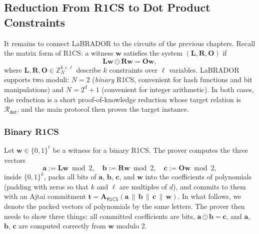 \documentclass[../../book.tex]{subfiles}
\begin{document}
\subsection{Reduction From R1CS to Dot Product Constraints}\label{section:labrador-r1cs}

It remains to connect LaBRADOR to the circuits of the previous chapters.
Recall the matrix form of R1CS: a witness $\mathbf{w}$ satisfies the system $(\mathbf{L}, \mathbf{R}, \mathbf{O})$ if
\begin{equation*}
    \mathbf{L}\mathbf{w} \odot \mathbf{R}\mathbf{w} = \mathbf{O}\mathbf{w},
\end{equation*}
where $\mathbf{L}, \mathbf{R}, \mathbf{O} \in \mathbb{Z}_N^{k \times \ell}$ describe $k$ constraints over $\ell$ variables.
LaBRADOR supports two moduli: $N = 2$ (\emph{binary} R1CS, convenient for hash functions and bit manipulations) and $N = 2^d + 1$ (convenient for integer arithmetic).
In both cases, the reduction is a short proof-of-knowledge reduction whose target relation is $\mathcal{R}_{\mathsf{dot}}$, and the main protocol then proves the target instance.

\subsubsection{Binary R1CS}

Let $\mathbf{w} \in \{0,1\}^{\ell}$ be a witness for a binary R1CS.
The prover computes the three vectors
\begin{equation*}
    \mathbf{a} := \mathbf{L}\mathbf{w} \bmod 2, \quad \mathbf{b} := \mathbf{R}\mathbf{w} \bmod 2, \quad \mathbf{c} := \mathbf{O}\mathbf{w} \bmod 2,
\end{equation*}
inside $\{0,1\}^k$, packs all bits of $\mathbf{a}$, $\mathbf{b}$, $\mathbf{c}$, and $\mathbf{w}$ into the coefficients of polynomials (padding with zeros so that $k$ and $\ell$ are multiples of $d$), and commits to them with an Ajtai commitment $\mathbf{t} = \mathbf{A}_{\mathsf{R1CS}}(\mathbf{a}\,\|\,\mathbf{b}\,\|\,\mathbf{c}\,\|\,\mathbf{w})$.
In what follows, we denote the packed vectors of polynomials by the same letters.
The prover then needs to show three things: all committed coefficients are bits, $\mathbf{a} \odot \mathbf{b} = \mathbf{c}$, and $\mathbf{a}$, $\mathbf{b}$, $\mathbf{c}$ are computed correctly from $\mathbf{w}$ modulo $2$.
\end{document}
